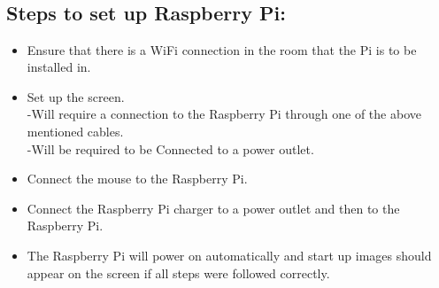 	\subsection*{\\Steps to set up Raspberry Pi:\\}
		\begin{itemize}
			\item Ensure that there is a WiFi connection in the room that the Pi is to be installed in.
			\item Set up the screen.\\ -Will require a connection to the Raspberry Pi through one of the above mentioned cables.\\-Will be required to be Connected to a power outlet.
			\item Connect the mouse to the Raspberry Pi.
			\item Connect the Raspberry Pi charger to a power outlet and then to the Raspberry Pi.
			\item The Raspberry Pi will power on automatically and start up images should appear on the screen if all steps were followed correctly.
	

\end{itemize}
